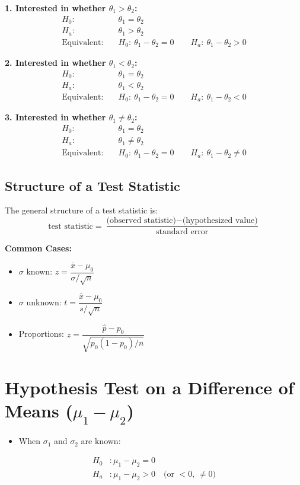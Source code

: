 \vspace{0.8em}
\noindent\textbf{1. Interested in whether $\theta_1 > \theta_2$:}
\begin{align*}
H_0\!:~ & \theta_1 = \theta_2 \\
H_a\!:~ & \theta_1 > \theta_2 \\
\text{Equivalent:} \quad & H_0\!:~ \theta_1 - \theta_2 = 0 \qquad H_a\!:~ \theta_1 - \theta_2 > 0
\end{align*}

\vspace{0.8em}
\noindent\textbf{2. Interested in whether $\theta_1 < \theta_2$:}
\begin{align*}
H_0\!:~ & \theta_1 = \theta_2 \\
H_a\!:~ & \theta_1 < \theta_2 \\
\text{Equivalent:} \quad & H_0\!:~ \theta_1 - \theta_2 = 0 \qquad H_a\!:~ \theta_1 - \theta_2 < 0
\end{align*}

\vspace{0.8em}
\noindent\textbf{3. Interested in whether $\theta_1 \ne \theta_2$:}
\begin{align*}
H_0\!:~ & \theta_1 = \theta_2 \\
H_a\!:~ & \theta_1 \ne \theta_2 \\
\text{Equivalent:} \quad & H_0\!:~ \theta_1 - \theta_2 = 0 \qquad H_a\!:~ \theta_1 - \theta_2 \ne 0
\end{align*}
\subsection*{Structure of a Test Statistic}

\noindent
The general structure of a test statistic is:
\[
\text{test statistic} = \frac{\text{(observed statistic)} - \text{(hypothesized value)}}{\text{standard error}}
\]

\bigskip
\noindent\textbf{Common Cases:}
\begin{itemize}
  \item $\sigma$ known: \quad $z = \dfrac{\bar{x} - \mu_0}{\sigma / \sqrt{n}}$
  \item $\sigma$ unknown: \quad $t = \dfrac{\bar{x} - \mu_0}{s / \sqrt{n}}$
  \item Proportions: \quad $z = \dfrac{\hat{p} - p_0}{\sqrt{p_0(1 - p_0)/n}}$
\end{itemize}
\section*{Hypothesis Test on a Difference of Means (\texorpdfstring{$\mu_1 - \mu_2$}{mu1 - mu2})}
\begin{itemize}
\item When $\sigma_1$ and $\sigma_2$ are known:
\end{itemize}
\begin{align*}
H_0&: \mu_1 - \mu_2 = 0 \\
H_a&: \mu_1 - \mu_2 > 0 \quad \text{(or } < 0 \text{, } \ne 0 \text{)}
\end{align*}

